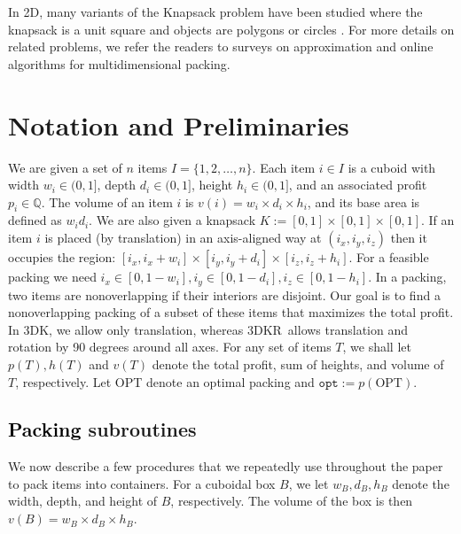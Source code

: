 \documentclass[10pt,a4paper]{amsart}
\newcommand{\kvnnew}[1]{\textcolor{black}{#1}}
\newcommand{\tdk}{\textsc{3DK}}
\newcommand{\tdkr}{\textsc{3DKR}}
\newcommand{\boxes}{containers\xspace}
\theoremstyle{definition}
\newcommand{\opt}{\mathtt{opt}}
\begin{document}
In 2D, many variants of the Knapsack problem have been studied where the knapsack is a unit square and objects are polygons \cite{MerinoW20} or circles \cite{AcharyaBG0MW24, ChagasNew}. 
For more details on related problems, we refer the readers to surveys \cite{alt2016computational, CKPT17} on approximation and online algorithms for multidimensional packing.




\section{Notation and Preliminaries}
\label{sec:prelim}
We are given a set of $n$ items $I=\{1, 2, \dots, n\}$.
Each item $i \in I$ is a cuboid with width $w_i \in (0,1]$, depth $d_i \in (0,1]$, height $h_i \in (0,1]$, and  an associated profit $p_i \in \mathbb{Q}$.
The volume of an item $i$ is $v(i)=w_i \times d_i \times h_i$,
and its base area is defined as $w_id_i$.
We are also given a knapsack $K:=[0,1]\times [0,1] \times [0,1]$.
If an item $i$ is placed (by translation) in an axis-aligned way at $(i_x, i_y, i_z)$ then it occupies the region: $[i_x, i_x+w_i]\times [i_y, i_y+d_i] \times [i_z, i_z+h_i]$.
For a feasible packing we need $i_x \in [0, 1-w_i], i_y \in [0, 1-d_i], i_z \in [0, 1-h_i]$.
In a packing, two items are nonoverlapping if their interiors are disjoint. 
Our goal is to find a nonoverlapping packing of a subset of these items that maximizes the total profit.
In \tdk, we allow only translation, whereas \tdkr~allows translation and rotation by 90 degrees around all axes.
For any set of items $T$, we shall let $p(T), h(T)$ and $v(T)$ denote the total profit, sum of heights, and volume of $T$, respectively. Let OPT denote an optimal packing and $\opt := p(\text{OPT})$.
\subsection{\kvnnew{Packing} subroutines}
\label{sec:subroutines}
We now describe a few procedures that we repeatedly use throughout the paper to pack items into \boxes. For a cuboidal box $B$, we let $w_B, d_B, h_B$ denote the width, depth, and height of $B$, respectively. The volume of the box is then $v(B) = w_B \times d_B \times h_B$.
\end{document}
